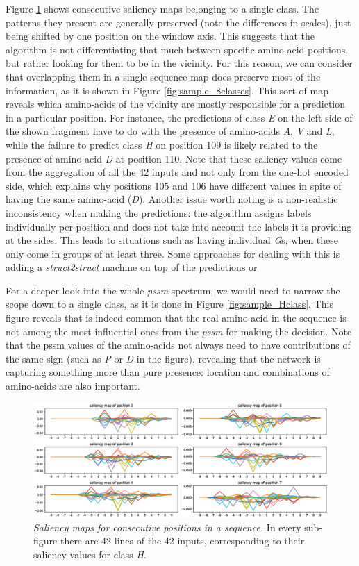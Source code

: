 	Figure \ref{fig:sliding} shows consecutive saliency maps belonging to a single class. The patterns they present are generally preserved (note the differences in scales), just being shifted by one position on the window axis. This suggests that the algorithm is not differentiating that much between specific amino-acid positions, but rather looking for them to be in the vicinity. For this reason, we can consider that overlapping them in a single sequence map does preserve most of the information, as it is shown in Figure \ref{fig:sample_8classes}. This sort of map reveals which amino-acids of the vicinity are mostly responsible for a prediction in a particular position. For instance, the  predictions of class \textit{E} on the left side of the shown fragment have to do with the presence of amino-acids \textit{A}, \textit{V} and \textit{L}, while the failure to predict class \textit{H} on position 109 is likely related to the presence of amino-acid \textit{D} at position 110. Note that these saliency values come from the aggregation of all the 42 inputs and not only from the one-hot encoded side, which explains why positions 105 and 106 have different values in spite of having the same amino-acid (\textit{D}). Another issue worth noting is a non-realistic inconsistency when making the predictions: the algorithm assigns labels individually per-position and does not take into account the labels it is providing at the sides. This leads to situations such as having individual \textit{G}s, when these only come in groups of at least three. Some approaches for dealing with this is adding a \textit{struct2struct} machine on top of the predictions \cite{Fang2017} or 
	
	For a deeper look into the whole \textit{pssm} spectrum, we would need to narrow the scope down to a single class, as it is done in Figure \ref{fig:sample_Hclass}. This figure reveals that is indeed common that the real amino-acid in the sequence is not among the most influential ones from the \textit{pssm} for making the decision. Note that the pssm values of the amino-acids not always need to have contributions of the same sign (such as \textit{P} or \textit{D} in the figure), revealing that the network is capturing something more than pure presence: location and combinations of amino-acids are also important.
	
	\begin{figure}
	\centering
	\includegraphics[width=1\linewidth]{Figures/sliding}
	\caption{\textit{Saliency maps for consecutive positions in a sequence.} In every sub-figure there are 42 lines of the 42 inputs, corresponding to their saliency values for class \textit{H}.}
	\label{fig:sliding}
	\end{figure}

